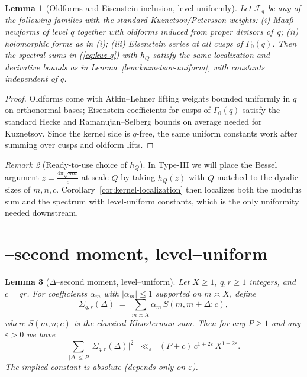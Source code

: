 \documentclass[11pt]{article}
\def\eqref#1{(\ref{#1})}%
\newtheorem{lemma}{Lemma}[part]
\theoremstyle{definition}
\theoremstyle{remark}
\newtheorem{remark}[lemma]{Remark}
\numberwithin{equation}{part}
\begin{document}
\begin{lemma}[Oldforms and Eisenstein inclusion, level-uniformly]\label{lem:old-eis-weights}
	Let $\mathcal F_q$ be any of the following families with the \emph{standard} Kuznetsov/Petersson weights: (i) Maaß newforms of level $q$ together with oldforms induced from proper divisors of~$q$; (ii) holomorphic forms as in (i); (iii) Eisenstein series at all cusps of $\Gamma_0(q)$. Then the spectral sums in \eqref{eq:kuz-q} with $h_Q$ satisfy the same localization and derivative bounds as in Lemma~\ref{lem:kuznetsov-uniform}, with constants independent of $q$.
\end{lemma}

\begin{proof}
	Oldforms come with Atkin–Lehner lifting weights bounded uniformly in $q$ on orthonormal bases; Eisenstein coefficients for cusps of $\Gamma_0(q)$ satisfy the standard Hecke and Ramanujan–Selberg bounds on average needed for Kuznetsov. Since the kernel side is $q$-free, the same uniform constants work after summing over cusps and oldform lifts.
\end{proof}

\begin{remark}[Ready-to-use choice of $h_Q$]\label{rem:choose-hQ}
	In Type-III we will place the Bessel argument $z=\tfrac{4\pi\sqrt{mn}}{c}$ at scale $Q$ by taking $h_Q(z)$ with $Q$ matched to the dyadic sizes of $m,n,c$. Corollary~\ref{cor:kernel-localization} then localizes both the modulus sum and the spectrum with level-uniform constants, which is the only uniformity needed downstream.
\end{remark}

\section{\textbf\textDelta--second moment, level--uniform}

\begin{lemma}[{\boldmath $\Delta$--second moment, level--uniform}]
	\label{lem:delta-second-moment}
	Let $X \ge 1$, $q,r \ge 1$ integers, and $c=qr$.
	For coefficients $\alpha_m$ with $|\alpha_m|\le 1$ supported on $m\asymp X$, define
	\[
		\Sigma_{q,r}(\Delta) \;=\; \sum_{m\asymp X} \alpha_m \, S(m,m+\Delta;c),
	\]
	where $S(m,n;c)$ is the classical Kloosterman sum. Then for any $P\ge 1$ and any $\varepsilon>0$ we have
	\[
		\sum_{|\Delta|\le P} \bigl|\Sigma_{q,r}(\Delta)\bigr|^2
		\;\;\ll_{\varepsilon}\;\; (P+c)\,c^{1+2\varepsilon}\,X^{1+2\varepsilon}.
	\]
	The implied constant is absolute (depends only on $\varepsilon$).
\end{lemma}
\end{document}
